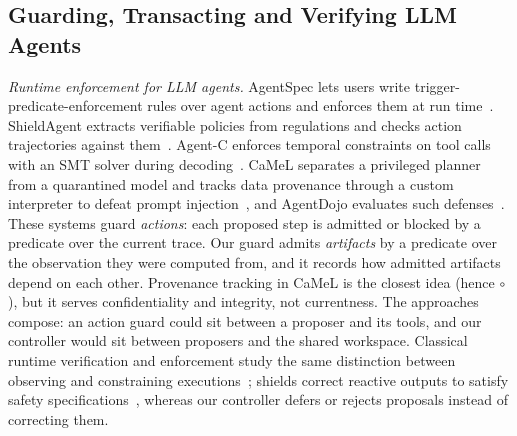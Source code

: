 \subsection{Guarding, Transacting and Verifying LLM Agents}
\emph{Runtime enforcement for LLM agents.} AgentSpec lets users write trigger-predicate-enforcement rules over agent actions and enforces them at run time~\cite{wang2026agentspec}. ShieldAgent extracts verifiable policies from regulations and checks action trajectories against them~\cite{chen2025shieldagent}. Agent-C enforces temporal constraints on tool calls with an SMT solver during decoding~\cite{kamath2025agentc}. CaMeL separates a privileged planner from a quarantined model and tracks data provenance through a custom interpreter to defeat prompt injection~\cite{debenedetti2025camel}, and AgentDojo evaluates such defenses~\cite{debenedetti2024agentdojo}. These systems guard \emph{actions}: each proposed step is admitted or blocked by a predicate over the current trace. Our guard admits \emph{artifacts} by a predicate over the observation they were computed from, and it records how admitted artifacts depend on each other. Provenance tracking in CaMeL is the closest idea (hence $\circ$), but it serves confidentiality and integrity, not currentness. The approaches compose: an action guard could sit between a proposer and its tools, and our controller would sit between proposers and the shared workspace. Classical runtime verification and enforcement study the same distinction between observing and constraining executions~\cite{schneider,leucker2009rv,pinisetty}; shields correct reactive outputs to satisfy safety specifications~\cite{shield}, whereas our controller defers or rejects proposals instead of correcting them.

